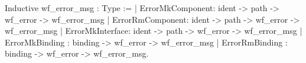 Inductive wf_error_msg : Type :=
  | ErrorMkComponent: ident -> path -> wf_error -> wf_error_msg
  | ErrorRmComponent: ident -> path -> wf_error -> wf_error_msg
  | ErrorMkInterface: ident -> path -> wf_error -> wf_error_msg
  | ErrorMkBinding  : binding -> wf_error -> wf_error_msg
  | ErrorRmBinding  : binding -> wf_error -> wf_error_msg.